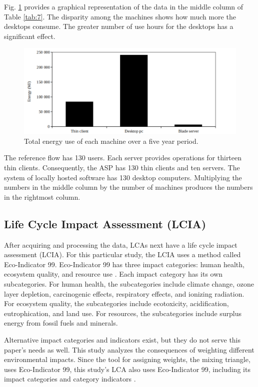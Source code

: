 \documentclass[final,journal,10pt,letterpaper,oneside,twocolumn,compsoc]%
{IEEEtran}
\begin{document}
Fig. \ref{fig:tab1} provides a graphical representation of the data in the
middle column of Table \ref{tab:7}. The disparity among the machines shows how
much more the desktops consume. The greater number of use hours for the desktops
has a significant effect.

\begin{figure}[t!]
  \centering
    \includegraphics[scale=0.425]{total_energy_use_over_five_years}
  \caption{Total energy use of each machine over a five year period.}
  \label{fig:tab1}
\end{figure}

The reference flow has 130 users. Each server provides operations for thirteen
thin
clients. Consequently, the ASP has 130 thin clients and ten servers. The system
of locally hosted software has 130 desktop computers. Multiplying the numbers in
the middle column by the number of machines produces the numbers in the
rightmost column.

\subsection{Life Cycle Impact Assessment (LCIA)}
After acquiring and processing the data, LCAs next have a life cycle impact
assessment (LCIA). For this particular study, the LCIA uses a method called
Eco-Indicator 99. Eco-Indicator 99 has three impact categories: human health,
ecosystem quality, and resource use \cite{pre}. Each impact category has its own
subcategories. For human health, the subcategories include climate
change, ozone layer depletion, carcinogenic effects, respiratory effects, and
ionizing radiation. For ecosystem quality, the subcategories include
ecotoxicity,
acidification, eutrophication, and land use. For resources, the subcategories
include surplus energy from fossil fuels and minerals. 

Alternative impact categories and indicators exist, but they do not serve this
paper's needs as well. This study analyzes the consequences of weighting
different environmental
impacts. Since the tool for assigning weights, the mixing triangle, uses
Eco-Indicator 99, this study's LCA also uses Eco-Indicator 99, including its
impact categories and category indicators \cite{triangle} \cite{pre}.
\end{document}
